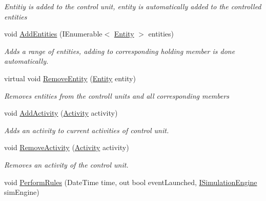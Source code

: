 \begin{DoxyCompactItemize}
\begin{DoxyCompactList}\small\item\em Entitiy is added to the control unit, entity is automatically added to the controlled entities \end{DoxyCompactList}\item 
void \hyperlink{class_simulation_core_1_1_h_c_c_m_elements_1_1_control_unit_af22ebba7f78eaaba0abda181e9199c59}{Add\+Entities} (I\+Enumerable$<$ \hyperlink{class_simulation_core_1_1_h_c_c_m_elements_1_1_entity}{Entity} $>$ entities)
\begin{DoxyCompactList}\small\item\em Adds a range of entities, adding to corresponding holding member is done automatically. \end{DoxyCompactList}\item 
virtual void \hyperlink{class_simulation_core_1_1_h_c_c_m_elements_1_1_control_unit_a00aeb796f1372d4aba9d2f1433696326}{Remove\+Entity} (\hyperlink{class_simulation_core_1_1_h_c_c_m_elements_1_1_entity}{Entity} entity)
\begin{DoxyCompactList}\small\item\em Removes entities from the controll units and all corresponding members \end{DoxyCompactList}\item 
void \hyperlink{class_simulation_core_1_1_h_c_c_m_elements_1_1_control_unit_a6997547152c9d598ab50327fa9b7b5b4}{Add\+Activity} (\hyperlink{class_simulation_core_1_1_h_c_c_m_elements_1_1_activity}{Activity} activity)
\begin{DoxyCompactList}\small\item\em Adds an activity to current activities of control unit. \end{DoxyCompactList}\item 
void \hyperlink{class_simulation_core_1_1_h_c_c_m_elements_1_1_control_unit_a1878f49ed1f07cdc8e75b8e190b8a1ca}{Remove\+Activity} (\hyperlink{class_simulation_core_1_1_h_c_c_m_elements_1_1_activity}{Activity} activity)
\begin{DoxyCompactList}\small\item\em Removes an activity of the control unit. \end{DoxyCompactList}\item 
void \hyperlink{class_simulation_core_1_1_h_c_c_m_elements_1_1_control_unit_ad9b777d29d9505a65085e61f1432b6b5}{Perform\+Rules} (Date\+Time time, out bool event\+Launched, \hyperlink{interface_simulation_core_1_1_simulation_classes_1_1_i_simulation_engine}{I\+Simulation\+Engine} sim\+Engine)

\end{DoxyCompactItemize}
